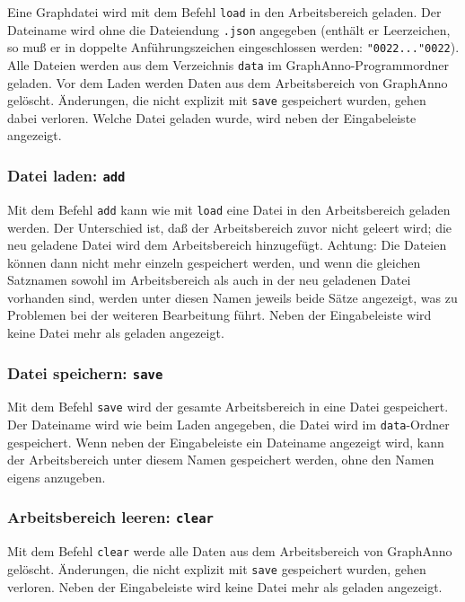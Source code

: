 \documentclass[12pt]{scrartcl}
\begin{document}
Eine Graphdatei wird mit dem Befehl \texttt{load} in den Arbeitsbereich geladen. Der Dateiname wird ohne die Dateiendung \texttt{.json} angegeben (enthält er Leerzeichen, so muß er in doppelte Anführungszeichen eingeschlossen werden: \texttt{\char"0022...\char"0022}). Alle Dateien werden aus dem Verzeichnis \texttt{data} im GraphAnno-Programmordner geladen. Vor dem Laden werden Daten aus dem Arbeitsbereich von GraphAnno gelöscht. Änderungen, die nicht explizit mit \texttt{save} gespeichert wurden, gehen dabei verloren.
Welche Datei geladen wurde, wird neben der Eingabeleiste angezeigt.


\subsubsection{Datei laden: \texttt{add}}

Mit dem Befehl \texttt{add} kann wie mit \texttt{load} eine Datei in den Arbeitsbereich geladen werden. Der Unterschied ist, daß der Arbeitsbereich zuvor nicht geleert wird; die neu geladene Datei wird dem Arbeitsbereich hinzugefügt. Achtung: Die Dateien können dann nicht mehr einzeln gespeichert werden, und wenn die gleichen Satznamen sowohl im Arbeitsbereich als auch in der neu geladenen Datei vorhanden sind, werden unter diesen Namen jeweils beide Sätze angezeigt, was zu Problemen bei der weiteren Bearbeitung führt.
Neben der Eingabeleiste wird keine Datei mehr als geladen angezeigt.


\subsubsection{Datei speichern: \texttt{save}}

Mit dem Befehl \texttt{save} wird der gesamte Arbeitsbereich in eine Datei gespeichert. Der Dateiname wird wie beim Laden angegeben, die Datei wird im \texttt{data}-Ordner gespeichert. Wenn neben der Eingabeleiste ein Dateiname angezeigt wird, kann der Arbeitsbereich unter diesem Namen gespeichert werden, ohne den Namen eigens anzugeben.


\subsubsection{Arbeitsbereich leeren: \texttt{clear}}

Mit dem Befehl \texttt{clear} werde alle Daten aus dem Arbeitsbereich von GraphAnno gelöscht. Änderungen, die nicht explizit mit \texttt{save} gespeichert wurden, gehen verloren.
Neben der Eingabeleiste wird keine Datei mehr als geladen angezeigt.
\end{document}
